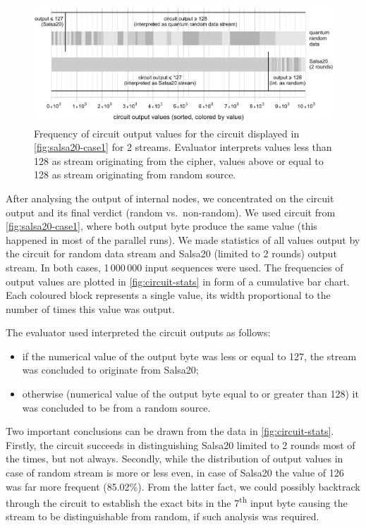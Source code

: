 \documentclass[12pt,twoside]{fithesis2}		%
\renewcommand{\_}{\leavevmode \kern0.0em\vbox{\hrule width0.4em}}
\newcommand{\squarebullet}{\textcolor{black}{\raisebox{0.15em}{\rule{4pt}{4pt}}}}
\newenvironment{myItemize}{
  \begin{itemize}[leftmargin=2em,rightmargin=1em,itemsep=\parskip ,parsep=0em,topsep=0em,partopsep=0em]
  \renewcommand{\labelitemi}{\squarebullet}
  \renewcommand{\labelitemii}{$\diamond$}
}{
  \end{itemize}
}
\begin{document}
\begin{figure}[t!]
\centering
\includegraphics[width=\textwidth]{images/circuit-stats}
\caption{Frequency of circuit output values for the circuit displayed in \autoref{fig:salsa20-case1} for 2 streams. 
Evaluator interprets
values less than 128 as stream originating from the cipher, values above or equal to 128 as stream originating from random source.}
\label{fig:circuit-stats}
\end{figure}

After analysing the output of internal nodes, we concentrated on the circuit output and its final verdict (random vs.\ non-random).
We used circuit from \autoref{fig:salsa20-case1}, where both output byte produce the same value (this happened in most of the
parallel runs).
We made statistics of all values output by the circuit for random data stream and Salsa20 (limited to 2 rounds) output stream.
In both cases, 1\,000\,000 input sequences were used. The frequencies of output values are plotted in \autoref{fig:circuit-stats}
in form of a cumulative bar chart. Each coloured block represents a single value, its width proportional to the number of times
this value was output. 

\noindent
The evaluator used interpreted the circuit outputs as follows:
\begin{myItemize}
\item if the numerical value of the output byte was less or equal to 127, the stream was concluded to originate from Salsa20;
\item otherwise (numerical value of the output byte equal to or greater than 128) it was concluded to be from a random source.
\end{myItemize}

\noindent
Two important conclusions can be drawn from the data in \autoref{fig:circuit-stats}. Firstly, the circuit succeeds in distinguishing
Salsa20 limited to 2 rounds most of the times, but not always. Secondly, while the distribution of output values in case of random
stream is more or less even, in case of Salsa20 the value of 126 was far more frequent (85.02\%). From the latter fact, we could
possibly backtrack through the circuit to establish the exact bits in the 7\textsuperscript{th} input byte causing the
stream to be distinguishable from random, if such analysis was required.
\end{document}
